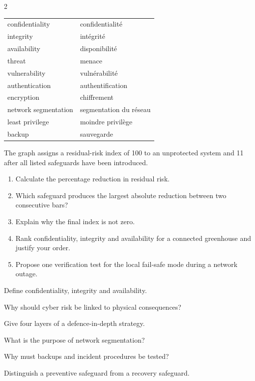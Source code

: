 \begin{multicols}{2}
\begin{vocabulary}
\begin{tabularx}{\linewidth}{@{}lX@{}}
confidentiality & confidentialité\\
integrity & intégrité\\
availability & disponibilité\\
threat & menace\\
vulnerability & vulnérabilité\\
authentication & authentification\\
encryption & chiffrement\\
network segmentation & segmentation du réseau\\
least privilege & moindre privilège\\
backup & sauvegarde
\end{tabularx}
\end{vocabulary}

\begin{applicationexercise}
The graph assigns a residual-risk index of 100 to an unprotected system and 11 after all listed
safeguards have been introduced.
\begin{enumerate}
\item Calculate the percentage reduction in residual risk.
\item Which safeguard produces the largest absolute reduction between two consecutive bars?
\item Explain why the final index is not zero.
\item Rank confidentiality, integrity and availability for a connected greenhouse and justify your order.
\item Propose one verification test for the local fail-safe mode during a network outage.
\end{enumerate}
\end{applicationexercise}

\begin{questions}
\item Define confidentiality, integrity and availability.
\item Why should cyber risk be linked to physical consequences?
\item Give four layers of a defence-in-depth strategy.
\item What is the purpose of network segmentation?
\item Why must backups and incident procedures be tested?
\item Distinguish a preventive safeguard from a recovery safeguard.
\end{questions}


\end{multicols}
